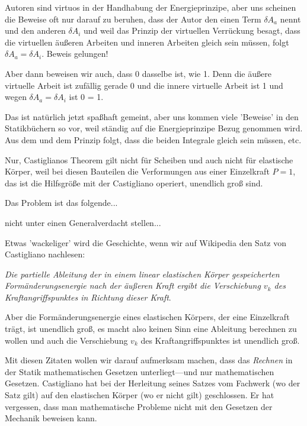 {Autoren sind virtuos in der Handhabung der Energieprinzipe, aber uns scheinen die Beweise oft nur darauf zu beruhen, dass der Autor den einen Term $\delta A_a$ nennt und den anderen $\delta A_i$ und weil das Prinzip der virtuellen Verr\"{u}ckung besagt, dass die virtuellen \"{a}u{\ss}eren Arbeiten und inneren Arbeiten gleich sein m\"{u}ssen, folgt $\delta A_a = \delta A_i$. Beweis gelungen!

Aber dann beweisen wir auch, dass 0 dasselbe ist, wie 1. Denn die \"{a}u{\ss}ere virtuelle Arbeit ist zuf\"{a}llig gerade 0 und die innere virtuelle Arbeit ist 1 und wegen $\delta A_a = \delta A_i$ ist 0 = 1.

Das ist nat\"{u}rlich jetzt spa{\ss}haft gemeint, aber uns kommen viele 'Beweise' in den Statikb\"{u}chern so vor, weil st\"{a}ndig auf die Energieprinzipe Bezug genommen wird. Aus dem und dem Prinzip folgt, dass die beiden Integrale gleich sein m\"{u}ssen, etc.

Nur, Castiglianos Theorem gilt nicht f\"{u}r Scheiben und auch nicht f\"{u}r elastische K\"{o}rper, weil bei diesen Bauteilen die Verformungen aus einer Einzelkraft $P = 1$, das ist die Hilfsgr\"{o}{\ss}e mit der Castigliano operiert, unendlich gro{\ss} sind.


Das Problem ist das folgende...

nicht unter einen Generalverdacht stellen...

Etwas 'wackeliger' wird die Geschichte, wenn wir auf Wikipedia den Satz von Castigliano nachlesen:

{\em Die partielle Ableitung der in einem linear elastischen K\"{o}rper gespeicherten Form\"{a}nderungsenergie nach der \"{a}u{\ss}eren Kraft ergibt die Verschiebung $v_k$ des Kraftangriffspunktes in Richtung dieser Kraft\/}.

Aber die Form\"{a}nderungsenergie eines elastischen K\"{o}rpers, der eine Einzelkraft tr\"{a}gt, ist unendlich gro{\ss}, es macht also keinen Sinn eine Ableitung berechnen zu wollen und auch die Verschiebung $v_k$ des Kraftangriffspunktes ist unendlich gro{\ss}.

Mit diesen Zitaten wollen wir darauf aufmerksam machen, dass das {\em Rechnen\/} in der Statik mathematischen Gesetzen unterliegt---und nur mathematischen Gesetzen. Castigliano hat bei der Herleitung seines Satzes vom Fachwerk (wo der Satz gilt) auf den elastischen K\"{o}rper (wo er nicht gilt) geschlossen. Er hat vergessen, dass man mathematische Probleme nicht mit den Gesetzen der Mechanik beweisen kann. \\

}
